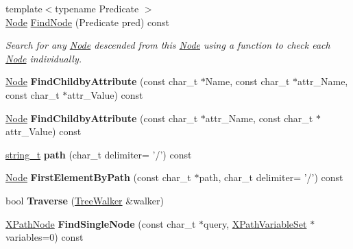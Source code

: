 \begin{DoxyCompactItemize}
{\footnotesize template$<$typename Predicate $>$ }\\\hyperlink{classphys_1_1xml_1_1Node}{Node} \hyperlink{classphys_1_1xml_1_1Node_a495663e5af0745f42e48bbfd21408c99}{FindNode} (Predicate pred) const 
\begin{DoxyCompactList}\small\item\em Search for any \hyperlink{classphys_1_1xml_1_1Node}{Node} descended from this \hyperlink{classphys_1_1xml_1_1Node}{Node} using a function to check each \hyperlink{classphys_1_1xml_1_1Node}{Node} individually. \item\end{DoxyCompactList}\item 
\hypertarget{classphys_1_1xml_1_1Node_a647302cd585c40fcdc9570176947706d}{
\hyperlink{classphys_1_1xml_1_1Node}{Node} {\bfseries FindChildbyAttribute} (const char\_\-t $\ast$Name, const char\_\-t $\ast$attr\_\-Name, const char\_\-t $\ast$attr\_\-Value) const }
\label{d7/d0a/classphys_1_1xml_1_1Node_a647302cd585c40fcdc9570176947706d}

\item 
\hypertarget{classphys_1_1xml_1_1Node_a3644bfc954295d9817f1385d2481a675}{
\hyperlink{classphys_1_1xml_1_1Node}{Node} {\bfseries FindChildbyAttribute} (const char\_\-t $\ast$attr\_\-Name, const char\_\-t $\ast$attr\_\-Value) const }
\label{d7/d0a/classphys_1_1xml_1_1Node_a3644bfc954295d9817f1385d2481a675}

\item 
\hypertarget{classphys_1_1xml_1_1Node_a74b9f51a6642808510e71f643cc861ad}{
\hyperlink{namespacephys_1_1xml_a6db751f2b35502e04c123bb70daa0d20}{string\_\-t} {\bfseries path} (char\_\-t delimiter= '/') const }
\label{d7/d0a/classphys_1_1xml_1_1Node_a74b9f51a6642808510e71f643cc861ad}

\item 
\hypertarget{classphys_1_1xml_1_1Node_a462333d5e538343ecf2150f71bc1a3be}{
\hyperlink{classphys_1_1xml_1_1Node}{Node} {\bfseries FirstElementByPath} (const char\_\-t $\ast$path, char\_\-t delimiter= '/') const }
\label{d7/d0a/classphys_1_1xml_1_1Node_a462333d5e538343ecf2150f71bc1a3be}

\item 
\hypertarget{classphys_1_1xml_1_1Node_abeb7db64dccb5ab42c27a3263ba5b549}{
bool {\bfseries Traverse} (\hyperlink{classphys_1_1xml_1_1TreeWalker}{TreeWalker} \&walker)}
\label{d7/d0a/classphys_1_1xml_1_1Node_abeb7db64dccb5ab42c27a3263ba5b549}

\item 
\hypertarget{classphys_1_1xml_1_1Node_a9026ddc7ccab8fcd844aa52ec09affc3}{
\hyperlink{classphys_1_1xml_1_1XPathNode}{XPathNode} {\bfseries FindSingleNode} (const char\_\-t $\ast$query, \hyperlink{classphys_1_1xml_1_1XPathVariableSet}{XPathVariableSet} $\ast$variables=0) const }
\label{d7/d0a/classphys_1_1xml_1_1Node_a9026ddc7ccab8fcd844aa52ec09affc3}


\end{DoxyCompactItemize}
